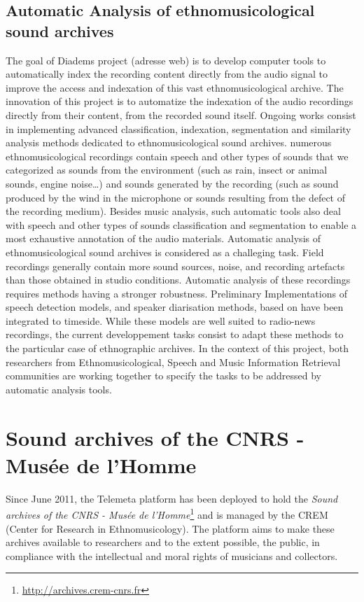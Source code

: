 \documentclass{sig-alternate}
\begin{document}
\subsection{Automatic Analysis of ethnomusicological sound archives}
The goal of Diadems project (adresse web) is to develop computer tools to automatically index the recording content directly from the audio signal to improve the access and indexation of this vast ethnomusicological archive. The innovation of this project is to automatize the indexation of the audio recordings directly from their content, from the recorded sound itself.
Ongoing works consist in implementing advanced classification, indexation, segmentation and similarity analysis methods dedicated to ethnomusicological sound archives.
numerous ethnomusicological recordings contain speech and other types of sounds that we categorized as sounds from the environment (such as rain, insect or animal sounds, engine noise…) and sounds generated by the recording (such as sound produced by the wind in the microphone or sounds resulting from the defect of the recording medium).
Besides music analysis, such automatic tools also deal with speech and other types of sounds classification and segmentation to enable a most exhaustive annotation of the audio materials.
Automatic analysis of ethnomusicological sound archives is considered as a challeging task.
Field recordings generally contain more sound sources, noise, and recording artefacts than those obtained in studio conditions.
Automatic analysis of these recordings requires methods having a stronger robustness.
Preliminary Implementations  of speech detection models, and speaker diarisation methods, based on  \cite{barras2006multistage} have been integrated to timeside. 
While these models are well suited to radio-news recordings, the current developpement tasks consist to adapt these methods to the particular case of ethnographic archives.
In the context of this project, both researchers from Ethnomusicological, Speech and Music Information Retrieval communities are working together to specify the tasks to be addressed by automatic analysis tools.
\section{Sound archives of the CNRS - Musée de l'Homme}\label{sec:archives-CREM}
Since June 2011, the Telemeta platform has been deployed to hold the \emph{Sound archives of the CNRS - Musée de l'Homme}\footnote{\url{http://archives.crem-cnrs.fr}} and is managed by the CREM (Center for Research in Ethnomusicology).
The platform aims to make these archives available to researchers and to the extent possible, the public, in compliance with the intellectual and moral rights of musicians and collectors.
\end{document}
